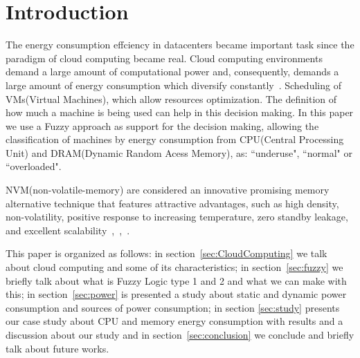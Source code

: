 \documentclass[runningheads,a4paper]{llncs}
\begin{document}
\section{Introduction}
The energy consumption effciency in datacenters became important task since the paradigm of cloud computing became real. Cloud computing environments demand a large amount of computational power and, consequently, demands a large amount of energy consumption which diversify constantly~\cite{NIST:2011}. Scheduling of VMs(Virtual Machines), which  allow resources optimization. The definition of how much a machine is being used can help in this decision making. In this paper we use a Fuzzy approach as support for the decision making, allowing the classification of machines by energy consumption from CPU(Central Processing Unit) and DRAM(Dynamic Random Acess Memory), as: ``underuse", ``normal" or ``overloaded".
 
NVM(non-volatile-memory) are considered an innovative promising memory alternative technique that features attractive advantages, such as high density, non-volatility, positive response to increasing temperature, zero standby leakage, and excellent scalability~\cite{Meikang},~\cite{fan2007power},~\cite{dong2011adams}.

This paper is organized as follows: in section~\ref{sec:CloudComputing} we talk about cloud computing and some of its characteristics; in section~\ref{sec:fuzzy} we briefly talk about what is Fuzzy Logic type 1 and 2 and what we can make with this; in section~\ref{sec:power} is presented a study about static and dynamic power consumption and sources of power consumption; in section \ref{sec:study} presents our case study about CPU and memory energy consumption with results and a discussion about our study and in section~\ref{sec:conclusion} we conclude and briefly talk about future works.


\end{document}
